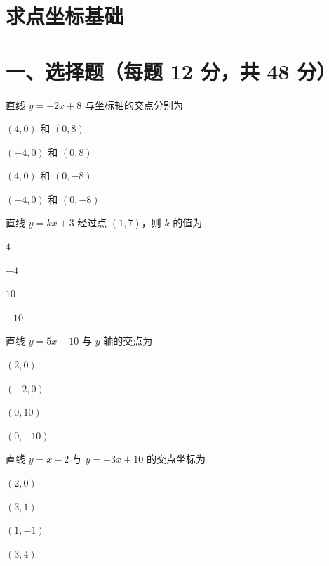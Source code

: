 \documentclass{exam-zh}
\begin{document}
\section*{求点坐标基础}

\section*{一、选择题（每题 12 分，共 48 分）}



\begin{question}[points=12]
  直线 $y = -2x + 8$ 与坐标轴的交点分别为
  \begin{choices}
    \item $(4, 0)$ 和 $(0, 8)$
    \item $(-4, 0)$ 和 $(0, 8)$
    \item $(4, 0)$ 和 $(0, -8)$
    \item $(-4, 0)$ 和 $(0, -8)$
  \end{choices}
\end{question}



\begin{question}[points=12]
  直线 $y = kx + 3$ 经过点 $(1, 7)$，则 $k$ 的值为
  \begin{choices}
    \item $4$
    \item $-4$
    \item $10$
    \item $-10$
  \end{choices}
\end{question}



\begin{question}[points=12]
  直线 $y = 5x - 10$ 与 $y$ 轴的交点为
  \begin{choices}
    \item $(2, 0)$
    \item $(-2, 0)$
    \item $(0, 10)$
    \item $(0, -10)$
  \end{choices}
\end{question}



\begin{question}[points=12]
  直线 $y = x - 2$ 与 $y = -3x + 10$ 的交点坐标为
  \begin{choices}
    \item $(2, 0)$
    \item $(3, 1)$
    \item $(1, -1)$
    \item $(3, 4)$
  \end{choices}
\end{question}
\end{document}
